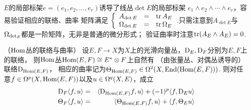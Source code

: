 $E$的局部标架$e=(e_1,e_2,...,e_r)$诱导了线丛$\det E$的局部标架
$e_1\wedge e_2\wedge\cdots\wedge e_r$，容易验证相应的联络、曲率
矩阵满足
$
  \left\{
    \begin{array}{lcl}
      A_{\det E} &=& \operatorname{tr} A_E\\
      \Omega_{\det E}&=& \operatorname{tr}\Omega_E
     \end{array}
  \right.
$.只需注意到$A_{\det E}$与$\Omega_{\det_E}$都是一阶矩阵，无非是普通的微分形式；
验证曲率时注意$\operatorname{tr}(A_E\wedge A_E)=0$.


\begin{prop}（$\operatorname{Hom}$丛的联络与曲率）
\label{Hom丛的联络与曲率-prop}
设$E,F\to X$为$X$上的光滑向量丛，$\mathrm{D}_E,\mathrm{D}_F$分别为$E,F$上的联络，
则$\operatorname{Hom}$丛$\operatorname{Hom}(E,F)\cong E^*\otimes F$上自然有
（由张量丛、对偶丛诱导的）联络$\mathrm{D}_{\operatorname{Hom}(E,F)}$，
相应的曲率记为$\Theta_{\operatorname{Hom}(E,F)}\in\Omega^2(X,\operatorname{End}(\operatorname{Hom}(E,F)))$.
则对任意$f\in\Omega^p(X,\operatorname{Hom}(E,F))$以及$u\in\Omega^q(X,E)$，成立
\begin{eqnarray*}
  \mathrm{D}_F\langle f,u \rangle
&=&
  \langle \mathrm{D}_{\operatorname{Hom}(E,F)}f,u \rangle
 +(-1)^p\langle f,\mathrm{D}_Eu \rangle
\\
  \Theta_F\langle f,u \rangle
&=&
  \langle \Theta_{\operatorname{Hom}(E,F)}f,u \rangle
 +\langle f,\Theta_Eu \rangle
\end{eqnarray*}
\end{prop}

